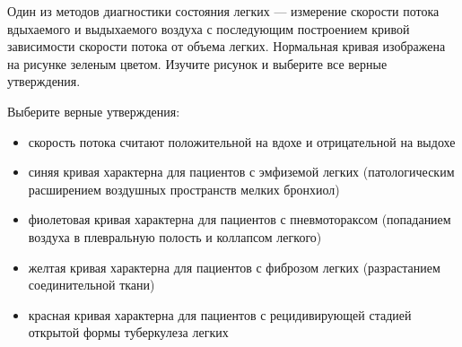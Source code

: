 
Один из методов
диагностики состояния легких — измерение скорости потока вдыхаемого и
выдыхаемого воздуха с последующим построением кривой зависимости скорости
потока от объема легких. Нормальная кривая изображена на рисунке зеленым
цветом. Изучите рисунок и выберите все верные утверждения.


Выберите верные утверждения:

\begin{itemize}
    \item скорость потока считают положительной на вдохе и отрицательной на выдохе
    \item синяя кривая характерна для пациентов с эмфиземой легких (патологическим расширением воздушных пространств мелких бронхиол)
    \item фиолетовая кривая характерна для пациентов с пневмотораксом (попаданием воздуха в плевральную полость и коллапсом легкого)
    \item желтая кривая характерна для пациентов с фиброзом легких (разрастанием соединительной ткани)
    \item красная кривая характерна для пациентов с рецидивирующей стадией открытой формы туберкулеза легких
\end{itemize}

\explanationSection

